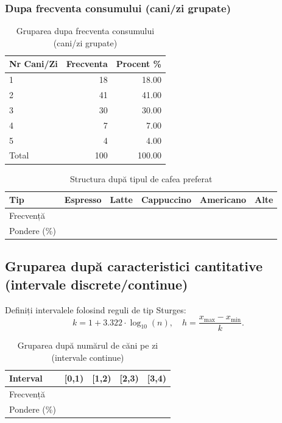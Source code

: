 \documentclass[12pt,a4paper]{report}
\begin{document}
\subsubsection{Dupa frecventa consumului (cani/zi grupate)}

\begin{table}[H]
\centering
\caption{Gruparea dupa frecventa consumului (cani/zi grupate)}
\begin{tabular}{lrr}
\toprule
Nr Cani/Zi & Frecventa & Procent \% \\
\midrule
1 & 18 & 18.00 \\
2 & 41 & 41.00 \\
3 & 30 & 30.00 \\
4 & 7 & 7.00 \\
5 & 4 & 4.00 \\
\bottomrule
Total & 100 & 100.00 \\
\end{tabular}
\end{table}

\begin{table}[H]
\centering
\caption{Frecventa consumului dupa sexe}
\end{table}


\begin{table}[H]
\centering
\caption{Structura după tipul de cafea preferat}
\label{tab:tip_cafea}
\begin{tabular}{@{}llllll@{}}
\toprule
Tip & Espresso & Latte & Cappuccino & Americano & Alte \\
\midrule
Frecvență &  &  &  &  &  \\
Pondere (\%) &  &  &  &  &  \\
\bottomrule
\end{tabular}
\end{table}

\subsection{Gruparea după caracteristici cantitative (intervale discrete/continue)}
Definiți intervalele folosind reguli de tip Sturges: 
$$
k = 1 + 3.322 \cdot \log_{10}(n), \quad h = \frac{x_{\max} - x_{\min}}{k}.
$$

\begin{table}[H]
\centering
\caption{Gruparea după numărul de căni pe zi (intervale continue)}
\label{tab:cani_intervale}
\begin{tabular}{@{}lllll@{}}
\toprule
Interval & [0,1) & [1,2) & [2,3) & [3,4) \\
\midrule
Frecvență &  &  &  &  \\
Pondere (\%) &  &  &  &  \\
\bottomrule
\end{tabular}
\end{table}
\end{document}
